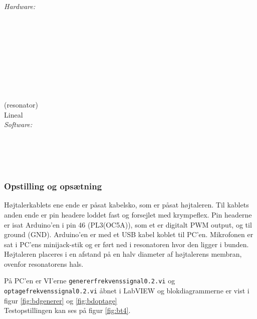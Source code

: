 		\textit{Hardware:}\\
		\tores\\
		\\
		\kabelsko\\
		\pins\\
		\krympeflex\\
		\arduino\\
		\mikrofon\\
		\PC\\
		\usbkabel\\
		 (resonator)\\
		Lineal\\
	
		\textit{Software:}\\
		\labview\\
		\visa\\
		\vi\\
		\ardsw\\
		
		
		\subsubsection{Opstilling og opsætning}
		
		Højtalerkablets ene ende er påsat kabelsko, som er påsat højtaleren. Til kablets anden ende er pin headere loddet fast og forsejlet med krympeflex. Pin headerne er isat Arduino'en i pin 46 (PL3(OC5A)), som et er digitalt PWM output, og til ground (GND). 
		Arduino'en er med et USB kabel koblet til PC'en.	
		Mikrofonen er sat i PC'ens minijack-stik og er ført ned i resonatoren hvor den ligger i bunden. Højtaleren placeres i en afstand på en halv diameter af højtalerens membran, ovenfor resonatorens hals. 
		
		På PC'en er VI'erne \texttt{genererfrekvenssignal0.2.vi} og \texttt{optagefrekvenssignal0.2.vi} åbnet i LabVIEW og blokdiagrammerne er vist i figur \ref{fig:bdgenerer} og \ref{fig:bdoptage} \\ Testopstillingen kan ses på figur \ref{fig:bt4}.  
		
